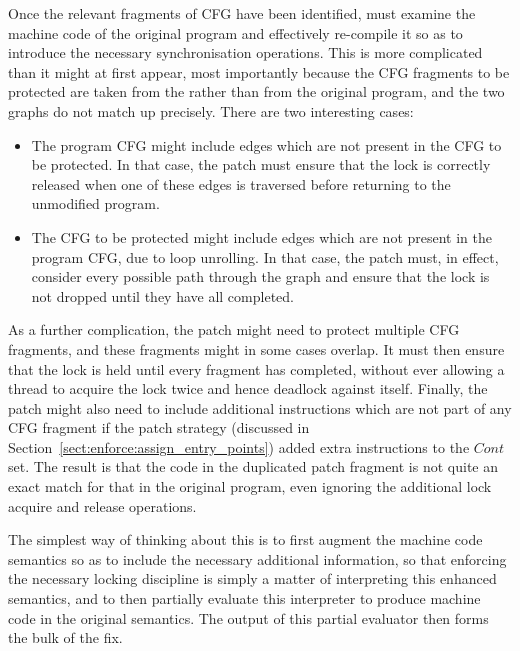 Once the relevant fragments of CFG have been identified, {\technique}
must examine the machine code of the original program and effectively
re-compile it so as to introduce the necessary synchronisation
operations.  This is more complicated than it might at first appear,
most importantly because the CFG fragments to be protected are taken
from the {\StateMachines} rather than from the original program, and
the two graphs do not match up precisely.  There are two interesting
cases:

\begin{itemize}
\item
  The program CFG might include edges which are not present in the CFG
  to be protected.  In that case, the patch must ensure that the lock
  is correctly released when one of these edges is traversed before
  returning to the unmodified program.
\item
  The CFG to be protected might include edges which are not present in
  the program CFG, due to loop unrolling.  In that case, the patch
  must, in effect, consider every possible path through the graph and
  ensure that the lock is not dropped until they have all completed.
\end{itemize}

As a further complication, the patch might need to protect multiple
CFG fragments, and these fragments might in some cases overlap.  It
must then ensure that the lock is held until every fragment has
completed, without ever allowing a thread to acquire the lock twice
and hence deadlock against itself.  Finally, the patch might also need
to include additional instructions which are not part of any CFG
fragment if the patch strategy (discussed in
Section~\ref{sect:enforce:assign_entry_points}) added extra
instructions to the $Cont$ set.  The result is that the
code in the duplicated patch fragment is not quite an exact match for
that in the original program, even ignoring the additional lock
acquire and release operations.

The simplest way of thinking about this is to first augment the
machine code semantics so as to include the necessary additional
information, so that enforcing the necessary locking discipline is
simply a matter of interpreting this enhanced semantics, and to then
partially evaluate this interpreter to produce machine code in the
original semantics.  The output of this partial evaluator then forms
the bulk of the fix.


